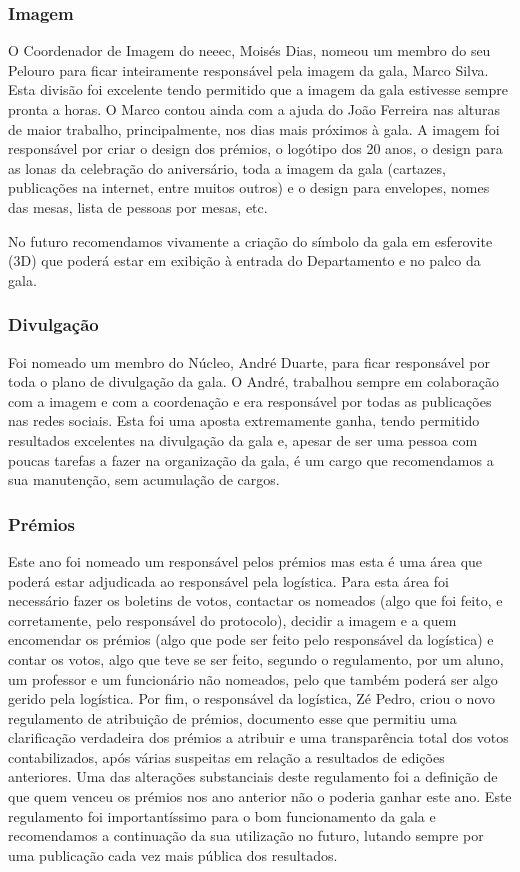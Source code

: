 \subsubsection{Imagem}
O Coordenador de Imagem do \acrshort{neeec}, Moisés Dias, nomeou um membro do seu Pelouro para ficar inteiramente responsável pela imagem da gala, Marco Silva. Esta divisão foi excelente tendo permitido que a imagem da gala estivesse sempre pronta a horas. O Marco contou ainda com a ajuda do João Ferreira nas alturas de maior trabalho, principalmente, nos dias mais próximos à gala. A imagem foi responsável por criar o design dos prémios, o logótipo dos 20 anos, o design para as lonas da celebração do aniversário, toda a imagem da gala (cartazes, publicações na internet, entre muitos outros) e o design para envelopes, nomes das mesas, lista de pessoas por mesas, etc.

No futuro recomendamos vivamente a criação do símbolo da gala em esferovite (3D) que poderá estar em exibição à entrada do Departamento e no palco da gala.

\subsubsection{Divulgação}
Foi nomeado um membro do Núcleo, André Duarte, para ficar responsável por toda o plano de divulgação da gala. O André, trabalhou sempre em colaboração com a imagem e com a coordenação e era responsável por todas as publicações nas redes sociais. Esta foi uma aposta extremamente ganha, tendo permitido resultados excelentes na divulgação da gala e, apesar de ser uma pessoa com poucas tarefas a fazer na organização da gala, é um cargo que recomendamos a sua manutenção, sem acumulação de cargos.

\subsubsection{Prémios}
Este ano foi nomeado um responsável pelos prémios mas esta é uma área que poderá estar adjudicada ao responsável pela logística. Para esta área foi necessário fazer os boletins de votos, contactar os nomeados (algo que foi feito, e corretamente, pelo responsável do protocolo), decidir a imagem e a quem encomendar os prémios (algo que pode ser feito pelo responsável da logística) e contar os votos, algo que teve se ser feito, segundo o regulamento, por um aluno, um professor e um funcionário não nomeados, pelo que também poderá ser algo gerido pela logística.
Por fim, o responsável da logística, Zé Pedro, criou o novo regulamento de atribuição de prémios, documento esse que permitiu uma clarificação verdadeira dos prémios a atribuir e uma transparência total dos votos contabilizados, após várias suspeitas em relação a resultados de edições anteriores. Uma das alterações substanciais deste regulamento foi a definição de que quem venceu os prémios nos ano anterior não o poderia ganhar este ano. Este regulamento foi importantíssimo para o bom funcionamento da gala e recomendamos a continuação da sua utilização no futuro, lutando sempre por uma publicação cada vez mais pública dos resultados.


